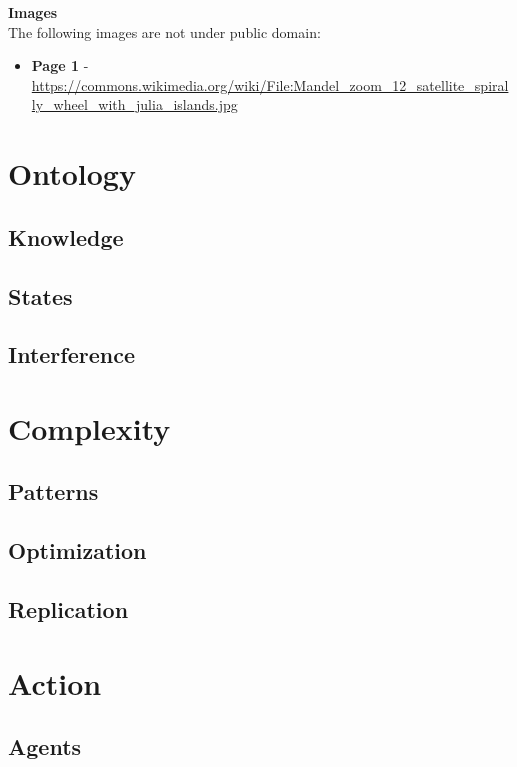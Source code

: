 \documentclass[oneside,hidelinks]{book}
\begin{document}
\textbf{Images}\\
The following images are not under public domain:
\begin{itemize}
\item \textbf{Page 1} - \url{https://commons.wikimedia.org/wiki/File:Mandel_zoom_12_satellite_spirally_wheel_with_julia_islands.jpg}
\end{itemize}

\tableofcontents

\part{Ontology}

\chapter{Knowledge}



\chapter{States}

\chapter{Interference}

\part{Complexity}

\chapter{Patterns}

\chapter{Optimization}

\chapter{Replication}

\part{Action}

\chapter{Agents}
\end{document}
